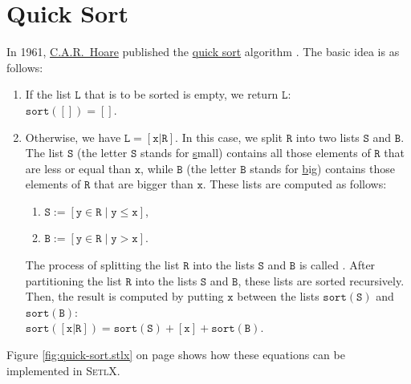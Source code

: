 \section{Quick Sort}
In 1961, \href{http://en.wikipedia.org/wiki/Tony_Hoare}{C.A.R.~Hoare} published the
\href{http://en.wikipedia.org/wiki/Quicksort}{quick sort}  
algorithm \cite{hoare:61}.  The basic idea is as follows:
\begin{enumerate}
\item If the list $\mathtt{L}$ that is to be sorted is empty, we return $\mathtt{L}$: 
      \\[0.2cm]
      \hspace*{1.3cm} $\mathtt{sort}([]) = []$.
\item Otherwise, we have $\mathtt{L} = [\mathtt{x}|\mathtt{R}]$.  In this case, we split $\mathtt{R}$ into two lists $\mathtt{S}$ and $\mathtt{B}$.
      The list $\mathtt{S}$ (the letter $\mathtt{S}$ stands for \underline{s}mall) contains all those elements of $\mathtt{R}$ that are less
      or equal than $\mathtt{x}$,     while $\mathtt{B}$ (the letter $\mathtt{B}$ stands for \underline{b}ig) contains
      those elements of $\mathtt{R}$ that are bigger than $\mathtt{x}$.  These lists are computed as follows:
      \begin{enumerate}
      \item $\mathtt{S} := [\mathtt{y} \in \mathtt{R} \mid \mathtt{y} \leq \mathtt{x}]$,
      \item $\mathtt{B} := [\mathtt{y} \in \mathtt{R} \mid \mathtt{y} > \mathtt{x}]$.
      \end{enumerate}
      The process of splitting the list $\mathtt{R}$ into the lists $\mathtt{S}$ and $\mathtt{B}$
      is called .  After partitioning the list $\mathtt{R}$ into the lists $\mathtt{S}$ and $\mathtt{B}$, these lists are sorted
      recursively.  Then, the result is computed by putting $\mathtt{x}$ between the lists $\mathtt{sort}(\mathtt{S})$ and $\mathtt{sort}(\mathtt{B})$:
      \\[0.2cm]
      \hspace*{1.3cm}
      $\mathtt{sort}([\mathtt{x}|\mathtt{R}]) = \mathtt{sort}(\mathtt{S}) + [\mathtt{x}] + \mathtt{sort}(\mathtt{B})$.
\end{enumerate}
Figure \ref{fig:quick-sort.stlx} on page \pageref{fig:quick-sort.stlx} shows how these equations can
be implemented in \textsc{SetlX}.

